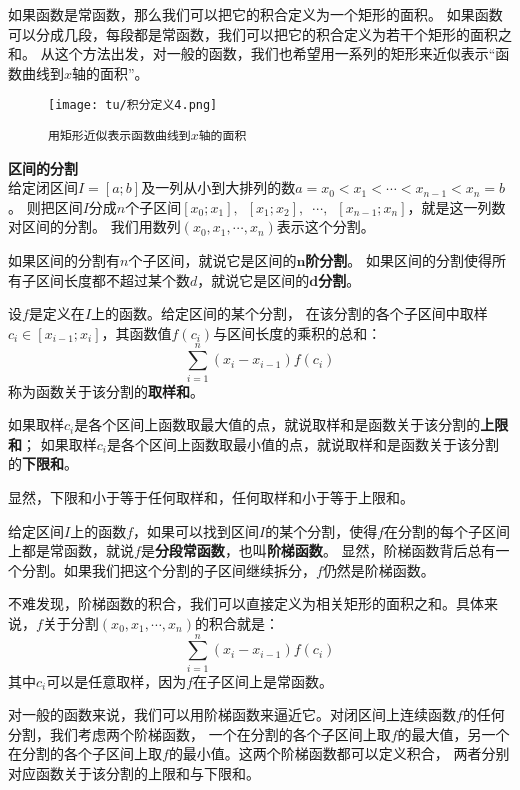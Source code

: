 \documentclass[12pt,UTF8]{ctexbook}
\begin{document}
\begin{appendix}
如果函数是常函数，那么我们可以把它的积合定义为一个矩形的面积。
如果函数可以分成几段，每段都是常函数，我们可以把它的积合定义为若干个矩形的面积之和。
从这个方法出发，对一般的函数，我们也希望用一系列的矩形来近似表示“函数曲线到$x$轴的面积”。

\begin{figure}[h] %
    \vspace{4pt}
    \centering
    \texttt{[image: tu/积分定义4.png]}
    \caption*{\texttt{用矩形近似表示函数曲线到$x$轴的面积}}
\end{figure}

\begin{df}{\textbf{区间的分割}}
    \mbox{} \\
    给定闭区间$I=[a; b]$及一列从小到大排列的数$a = x_0 < x_1 < \cdots < x_{n-1} < x_n = b$。
    则把区间$I$分成$n$个子区间$[x_0; x_1], \,\,\, [x_1; x_2], \,\,\,\cdots, \,\,\,[x_{n-1}; x_n]$，就是这一列数对区间的分割。
    我们用数列$(x_0, x_1, \cdots, x_n)$表示这个分割。

    如果区间的分割有$n$个子区间，就说它是区间的$\boldsymbol{n}$\textbf{阶分割}。
    如果区间的分割使得所有子区间长度都不超过某个数$d$，就说它是区间的$\boldsymbol{d}$\textbf{\dash 分割}。

    设$f$是定义在$I$上的函数。给定区间的某个分割，
    在该分割的各个子区间中取样$c_i\in [x_{i-1}; x_{i}]$，其函数值$f(c_i)$与区间长度的乘积的总和：
    $$ \sum_{i=1}^n (x_i - x_{i-1}) f(c_i) $$
    称为函数关于该分割的\textbf{取样和}。

    如果取样$c_i$是各个区间上函数取最大值的点，就说取样和是函数关于该分割的\textbf{上限和}；
    如果取样$c_i$是各个区间上函数取最小值的点，就说取样和是函数关于该分割的\textbf{下限和}。

    显然，下限和小于等于任何取样和，任何取样和小于等于上限和。

\end{df}

给定区间$I$上的函数$f$，如果可以找到区间$I$的某个分割，使得$f$在分割的每个子区间上都是常函数，就说$f$是\textbf{分段常函数}，也叫\textbf{阶梯函数}。
显然，阶梯函数背后总有一个分割。如果我们把这个分割的子区间继续拆分，$f$仍然是阶梯函数。

不难发现，阶梯函数的积合，我们可以直接定义为相关矩形的面积之和。具体来说，$f$关于分割$(x_0, x_1, \cdots, x_n)$的积合就是：
$$ \sum_{i=1}^n (x_i - x_{i-1}) f(c_i) $$
其中$c_i$可以是任意取样，因为$f$在子区间上是常函数。

对一般的函数来说，我们可以用阶梯函数来逼近它。对闭区间上连续函数$f$的任何分割，我们考虑两个阶梯函数，
一个在分割的各个子区间上取$f$的最大值，另一个在分割的各个子区间上取$f$的最小值。这两个阶梯函数都可以定义积合，
两者分别对应函数关于该分割的上限和与下限和。


\end{appendix}
\end{document}
